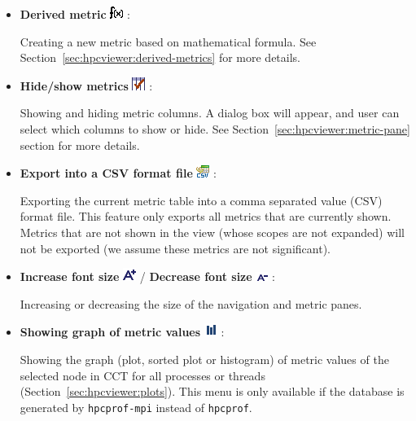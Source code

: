 \begin{itemize}
\item \textbf{Derived metric} \includegraphics[scale=.8]{fig/hpcviewer-button-derivedmetric.png} :

Creating a new metric based on mathematical formula.
See Section~\ref{sec:hpcviewer:derived-metrics} for more details.

\item \textbf{Hide/show metrics} \includegraphics[scale=.8]{fig/hpcviewer-button-checkcolumns.png} :

Showing and hiding metric columns.
A dialog box will appear, and user can select which columns to show or hide.
See Section~\ref{sec:hpcviewer:metric-pane} section for more details.

\item \textbf{Export into a CSV format file} \includegraphics[scale=.8]{fig/hpcviewer-button-csv.png} :

Exporting the current metric table into a comma separated value (CSV) format file.
This feature only exports all metrics that are currently shown.
Metrics that are not shown in the view (whose scopes are not expanded) will not be exported (we assume these metrics are not significant).

\item \textbf{Increase font size} \includegraphics[scale=.8]{fig/hpcviewer-button-fontplus.png} /
      \textbf{Decrease font size} \includegraphics[scale=.8]{fig/hpcviewer-button-fontminus.png} :

Increasing or decreasing the size of the navigation and metric panes.

\item \textbf{Showing graph of metric values} \includegraphics[scale=.8]{fig/hpcviewer-button-graph.png} :

Showing the graph (plot, sorted plot or histogram) of metric values of the selected node in CCT for all processes or threads (Section~\ref{sec:hpcviewer:plots}). 
This menu is only available if the database is generated by \texttt{hpcprof-mpi} instead of \texttt{hpcprof}. 


\end{itemize}
